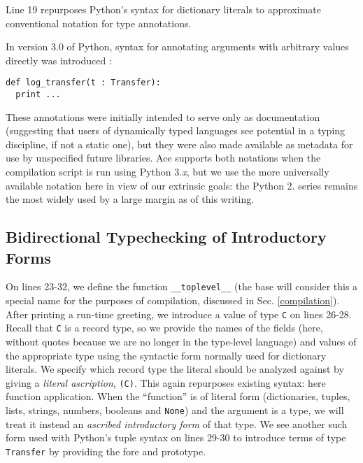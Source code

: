 \documentclass[10pt,preprint]{sigplanconf}
\begin{document}
Line 19 repurposes Python's syntax for dictionary literals to approximate  conventional notation for type annotations.
 {In version 3.0 of Python, syntax for annotating arguments with arbitrary values directly was introduced \cite{pep3107}:
\begin{lstlisting}[numbers=none]
def log_transfer(t : Transfer): 
  print ...
\end{lstlisting}
\vspace{-5px}
These annotations were initially intended to serve only as documentation (suggesting that users of dynamically typed languages see potential in a typing discipline, if not a static one), but they were also made available as metadata for use by unspecified  future libraries. Ace supports both notations when the compilation script is run using Python 3.\textit{x}, but we use the more universally available notation here in view of our extrinsic goals: the Python 2. series  remains the most widely used by a large margin as of this writing.%

\subsection{Bidirectional Typechecking of Introductory Forms}
On lines 23-32, we define the function \verb|__toplevel__| (the base will consider this a special name for the purposes of compilation, discussed in Sec. \ref{compilation}). After printing a run-time greeting, we introduce a value of type \verb|C| on lines 26-28. Recall that \verb|C| is a record type, so we provide the names of the fields (here, without quotes because we are no longer in the type-level language) and values of the appropriate type using the syntactic form normally used for dictionary literals. We specify which record type the literal should be {analyzed} against by giving a \emph{literal ascription}, \verb|(C)|. This again repurposes existing  syntax: here function application. When the ``function'' is of literal form (dictionaries, tuples, lists, strings, numbers, booleans and  \verb|None|) and the argument is a type, we will treat it instead an \emph{ascribed introductory form} of that type. We see another such form used with Python's tuple syntax on lines 29-30 to introduce terms of type \verb|Transfer| by providing the fore and prototype.

}
\end{document}
